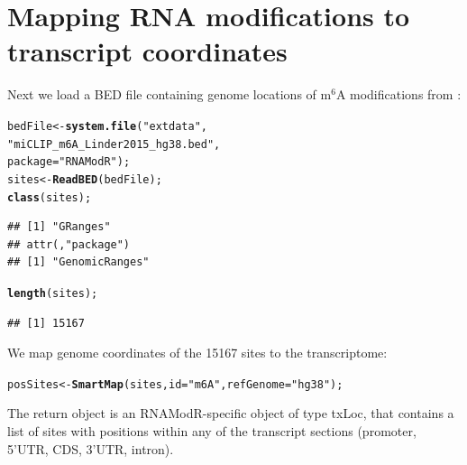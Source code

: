 \documentclass[a4paper,11pt]{article}\usepackage[]{graphicx}\usepackage[]{color}
\makeatletter
\newcommand{\hlstr}[1]{\textcolor[rgb]{0.192,0.494,0.8}{#1}}%
\newcommand{\hlstd}[1]{\textcolor[rgb]{0.345,0.345,0.345}{#1}}%
\newcommand{\hlkwb}[1]{\textcolor[rgb]{0.69,0.353,0.396}{#1}}%
\newcommand{\hlkwc}[1]{\textcolor[rgb]{0.333,0.667,0.333}{#1}}%
\newcommand{\hlkwd}[1]{\textcolor[rgb]{0.737,0.353,0.396}{\textbf{#1}}}%
\newenvironment{kframe}{%
 \def\at@end@of@kframe{}%
 \ifinner\ifhmode%
  \def\at@end@of@kframe{\end{minipage}}%
  \begin{minipage}{\columnwidth}%
 \fi\fi%
 \def\FrameCommand##1{\hskip\@totalleftmargin \hskip-\fboxsep
 \colorbox{shadecolor}{##1}\hskip-\fboxsep
     \hskip-\linewidth \hskip-\@totalleftmargin \hskip\columnwidth}%
 \MakeFramed {\advance\hsize-\width
   \@totalleftmargin\z@ \linewidth\hsize
   \@setminipage}}%
 {\par\unskip\endMakeFramed%
 \at@end@of@kframe}
\newenvironment{knitrout}{}{} %
\makeatother
\begin{document}
\section{Mapping RNA modifications to transcript coordinates}
Next we load a BED file containing genome locations of m$^{6}$A modifications from \cite{?}:
\begin{knitrout}
\color{fgcolor}\begin{kframe}
\begin{alltt}
\hlstd{bedFile} \hlkwb{<-} \hlkwd{system.file}\hlstd{(}\hlstr{"extdata"}\hlstd{,}
                       \hlstr{"miCLIP_m6A_Linder2015_hg38.bed"}\hlstd{,}
                       \hlkwc{package} \hlstd{=} \hlstr{"RNAModR"}\hlstd{);}
\hlstd{sites} \hlkwb{<-} \hlkwd{ReadBED}\hlstd{(bedFile);}
\hlkwd{class}\hlstd{(sites);}
\end{alltt}
\begin{verbatim}
## [1] "GRanges"
## attr(,"package")
## [1] "GenomicRanges"
\end{verbatim}
\begin{alltt}
\hlkwd{length}\hlstd{(sites);}
\end{alltt}
\begin{verbatim}
## [1] 15167
\end{verbatim}
\end{kframe}
\end{knitrout}

We map genome coordinates of the 15167 sites to the transcriptome:
\begin{knitrout}
\color{fgcolor}\begin{kframe}
\begin{alltt}
\hlstd{posSites} \hlkwb{<-} \hlkwd{SmartMap}\hlstd{(sites,} \hlkwc{id} \hlstd{=} \hlstr{"m6A"}\hlstd{,} \hlkwc{refGenome} \hlstd{=} \hlstr{"hg38"}\hlstd{);}
\end{alltt}
\end{kframe}
\end{knitrout}
The return object is an RNAModR-specific object of type txLoc, that contains a list of sites with positions within any of the transcript sections (promoter, 5'UTR, CDS, 3'UTR, intron).
\end{document}
